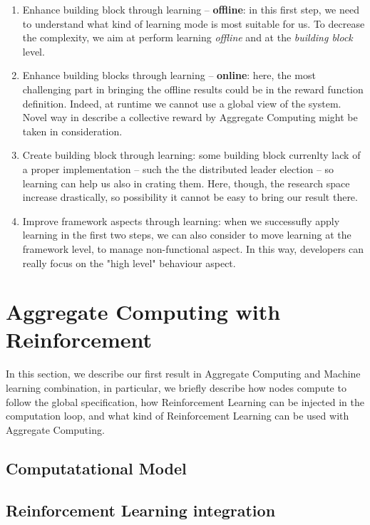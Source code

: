 \documentclass[
  twocolumn,
]{ceurart}
\begin{document}
\begin{enumerate}
  \item Enhance building block through learning -- \textbf{offline}: in this first step, we 
  need to understand what kind of learning mode is most suitable for us. To decrease the complexity,
  we aim at perform learning \textit{offline} and at the \textit{building block} level.
  \item Enhance building blocks through learning -- \textbf{online}: here, the most challenging part
  in bringing the offline results could be in the reward function definition. Indeed, at runtime
  we cannot use a global view of the system. Novel way in describe a collective reward by Aggregate Computing
  might be taken in consideration.
  \item Create building block through learning: some building block currenlty lack of a proper implementation -- 
  such the the distributed leader election -- so learning can help us also in crating them. 
  Here, though, the research space increase drastically, so possibility it cannot be easy to bring our 
  result there.
  \item Improve framework aspects through learning: when we successufly apply learning in the first two steps, 
  we can also consider to move learning at the framework level, to manage non-functional aspect. In this way,
  developers can really focus on the "high level" behaviour aspect.
\end{enumerate}

\section{Aggregate Computing with Reinforcement}
In this section, we describe our first result in Aggregate Computing and Machine learning combination,
 in particular, we briefly describe how nodes compute to follow the global specification,
 how Reinforcement Learning can be injected in the computation loop,
 and what kind of Reinforcement Learning can be used with Aggregate Computing.
\subsection{Computatational Model}
\subsection{Reinforcement Learning integration}
\end{document}
